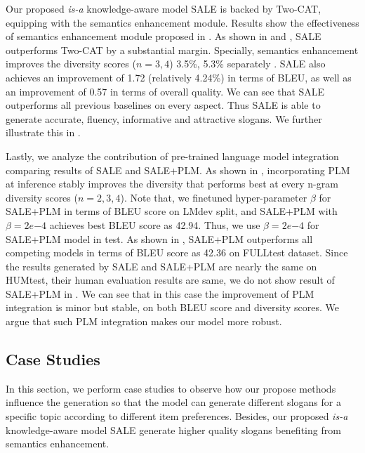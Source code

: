 Our proposed \emph{is-a} knowledge-aware model SALE 
is backed by Two-CAT, equipping with the semantics enhancement module.
Results show the effectiveness of semantics enhancement module
proposed in .
As shown in  and , 
SALE outperforms Two-CAT by a substantial margin.
Specially, semantics enhancement improves the
diversity scores ($n=3, 4$) 3.5\%, 5.3\% separately .
SALE also achieves an improvement of 1.72 (relatively 4.24\%) in terms of BLEU, 
as well as an improvement of 0.57 in terms of overall quality.
We can see that SALE outperforms all previous baselines on every aspect.
Thus SALE is able to generate accurate, fluency, informative and attractive slogans.
We further illustrate this in . 



Lastly, we analyze the contribution of pre-trained language model integration
comparing results of SALE and SALE+PLM.
As shown in , 
incorporating PLM at inference stably improves the diversity 
that performs best at every n-gram diversity scores ($n=2,3,4$).
Note that, we finetuned hyper-parameter $\beta$ for SALE+PLM 
in terms of BLEU score on LMdev split,
and SALE+PLM with $\beta = 2e\mathrm{-}4$ achieves best BLEU score as 42.94.
Thus, we use $\beta=2e\mathrm{-}4$ for SALE+PLM model in test.
As shown in , SALE+PLM 
outperforms all competing models in terms of BLEU score as 42.36 
on FULLtest dataset.
Since the results generated by SALE and SALE+PLM are nearly the same on HUMtest,
their human evaluation results are same, 
we do not show result of SALE+PLM in .
We can see that in this case the improvement of PLM integration is minor but stable, 
on both BLEU score and diversity scores.
We argue that such PLM integration makes our model more robust.





\subsection{Case Studies}
\label{sec:cases}
In this section, we perform case studies to observe 
how our propose methods influence the generation so that
the model can generate different slogans for a specific topic
according to different item preferences.
Besides, our proposed \emph{is-a} knowledge-aware model SALE generate higher quality slogans
benefiting from semantics enhancement.

